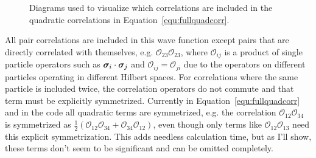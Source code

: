 \begin{figure}[h]
   \caption{Diagrams used to visualize which correlations are included in the quadratic correlations in Equation~\ref{equ:fullquadcorr}.}
   \label{fig:quaddiagrams}
\end{figure}
All pair correlations are included in this wave function except pairs that are directly correlated with themselves, e.g. $\mathcal{O}_{23}\mathcal{O}_{23}$, where $\mathcal{O}_{ij}$ is a product of single particle operators such as $\bm{\sigma}_i\cdot\bm{\sigma}_j$ and $\mathcal{O}_{ij}=\mathcal{O}_{ji}$ due to the operators on different particles operating in different Hilbert spaces. For correlations where the same particle is included twice, the correlation operators do not commute and that term must be explicitly symmetrized. Currently in Equation~\ref{equ:fullquadcorr} and in the code all quadratic terms are symmetrized, e.g. the correlation $\mathcal{O}_{12}\mathcal{O}_{34}$ is symmetrized as $\frac{1}{2}\left(\mathcal{O}_{12}\mathcal{O}_{34}+\mathcal{O}_{34}\mathcal{O}_{12}\right)$, even though only terms like $\mathcal{O}_{12}\mathcal{O}_{13}$ need this explicit symmetrization. This adds needless calculation time, but as I'll show, these terms don't seem to be significant and can be omitted completely.

